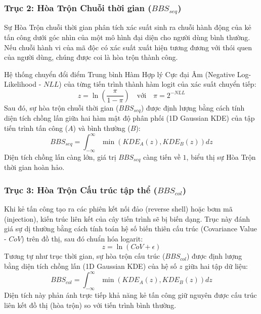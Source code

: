 \documentclass[../main.tex]{subfiles}
\begin{document}
\subsubsection{Trục 2: Hòa Trộn Chuỗi thời gian ($BBS_{seq}$)}
Sự Hòa Trộn chuỗi thời gian phân tích xác suất sinh ra chuỗi hành động của kẻ tấn công dưới góc nhìn của một mô hình đại diện cho người dùng bình thường. Nếu chuỗi hành vi của mã độc có xác suất xuất hiện tương đương với thói quen của người dùng, chúng được coi là hòa trộn thành công. 

Hệ thống chuyển đổi điểm Trung bình Hàm Hợp lý Cực đại Âm (Negative Log-Likelihood - $NLL$) của từng tiến trình thành hàm logit của xác suất chuyển tiếp:
\begin{equation}
    z = \ln\left(\frac{\pi}{1-\pi}\right) \quad \text{với} \quad \pi = 2^{-NLL}
\end{equation}
Sau đó, sự hòa trộn chuỗi thời gian ($BBS_{seq}$) được định lượng bằng cách tính diện tích chồng lấn giữa hai hàm mật độ phân phối (1D Gaussian KDE) của tập tiến trình tấn công ($A$) và bình thường ($B$):
\begin{equation}
    BBS_{seq} = \int_{-\infty}^{\infty} \min\left(KDE_A(z), KDE_B(z)\right) dz
\end{equation}
Diện tích chồng lấn càng lớn, giá trị $BBS_{seq}$ càng tiến về $1$, biểu thị sự Hòa Trộn thời gian hoàn hảo.

\subsubsection{Trục 3: Hòa Trộn Cấu trúc tập thể ($BBS_{col}$)}
Khi kẻ tấn công tạo ra các phiên kết nối đảo (reverse shell) hoặc bơm mã (injection), kiến trúc liên kết của cây tiến trình sẽ bị biến dạng. Trục này đánh giá sự dị thường bằng cách tính toán hệ số biến thiên cấu trúc (Covariance Value - $CoV$) trên đồ thị, sau đó chuẩn hóa logarit:
\begin{equation}
    z = \ln(CoV + \epsilon)
\end{equation}
Tương tự như trục thời gian, sự hòa trộn cấu trúc ($BBS_{col}$) được định lượng bằng diện tích chồng lấn (1D Gaussian KDE) của hệ số $z$ giữa hai tập dữ liệu:
\begin{equation}
    BBS_{col} = \int_{-\infty}^{\infty} \min\left(KDE_A(z), KDE_B(z)\right) dz
\end{equation}
Diện tích này phản ánh trực tiếp khả năng kẻ tấn công giữ nguyên được cấu trúc liên kết đồ thị (hòa trộn) so với tiến trình bình thường.
\end{document}
